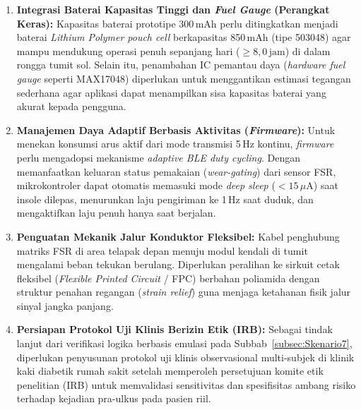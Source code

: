\begin{enumerate}
    \item \textbf{Integrasi Baterai Kapasitas Tinggi dan \textit{Fuel Gauge} (Perangkat Keras):}
    Kapasitas baterai prototipe 300\,mAh perlu ditingkatkan menjadi baterai \textit{Lithium Polymer pouch cell} berkapasitas 850\,mAh (tipe 503048) agar mampu mendukung operasi penuh sepanjang hari ($\ge 8{,}0\,\mathrm{jam}$) di dalam rongga tumit sol. Selain itu, penambahan IC pemantau daya (\textit{hardware fuel gauge} seperti MAX17048) diperlukan untuk menggantikan estimasi tegangan sederhana agar aplikasi dapat menampilkan sisa kapasitas baterai yang akurat kepada pengguna.

    \item \textbf{Manajemen Daya Adaptif Berbasis Aktivitas (\textit{Firmware}):}
    Untuk menekan konsumsi arus aktif dari mode transmisi 5\,Hz kontinu, \textit{firmware} perlu mengadopsi mekanisme \textit{adaptive BLE duty cycling}. Dengan memanfaatkan keluaran status pemakaian (\textit{wear-gating}) dari sensor FSR, mikrokontroler dapat otomatis memasuki mode \textit{deep sleep} ($< 15\,\mu\mathrm{A}$) saat insole dilepas, menurunkan laju pengiriman ke 1\,Hz saat duduk, dan mengaktifkan laju penuh hanya saat berjalan.

    \item \textbf{Penguatan Mekanik Jalur Konduktor Fleksibel:}
    Kabel penghubung matriks FSR di area telapak depan menuju modul kendali di tumit mengalami beban tekukan berulang. Diperlukan peralihan ke sirkuit cetak fleksibel (\textit{Flexible Printed Circuit} / FPC) berbahan poliamida dengan struktur penahan regangan (\textit{strain relief}) guna menjaga ketahanan fisik jalur sinyal jangka panjang.

    \item \textbf{Persiapan Protokol Uji Klinis Berizin Etik (IRB):}
    Sebagai tindak lanjut dari verifikasi logika berbasis emulasi pada Subbab~\ref{subsec:Skenario7}, diperlukan penyusunan protokol uji klinis observasional multi-subjek di klinik kaki diabetik rumah sakit setelah memperoleh persetujuan komite etik penelitian (IRB) untuk memvalidasi sensitivitas dan spesifisitas ambang risiko terhadap kejadian pra-ulkus pada pasien riil.
\end{enumerate}
